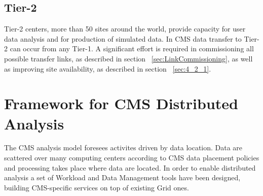 
\subsection{Tier-2}
\label{sec:2_3}
Tier-2 centers, more than 50 sites around the world,  provide capacity for user data analysis and for production of simulated data.
In CMS data transfer to Tier-2 can occur from any Tier-1. A significant effort is required in 
commissioning all possible transfer links, as described in section ~\ref{sec:LinkCommissioning}, as well
as improving site availability, as described in section ~\ref{sec:4_2_1}.

\section{Framework for CMS Distributed Analysis}
\label{sec:3}
The CMS analysis model foresees activites driven by data location. Data are scattered over many computing centers according to CMS data placement policies and processing takes place where data are located. In order to enable distributed analysis a set of Workload and Data Management tools have been designed, building CMS-specific services on top of existing Grid ones.


